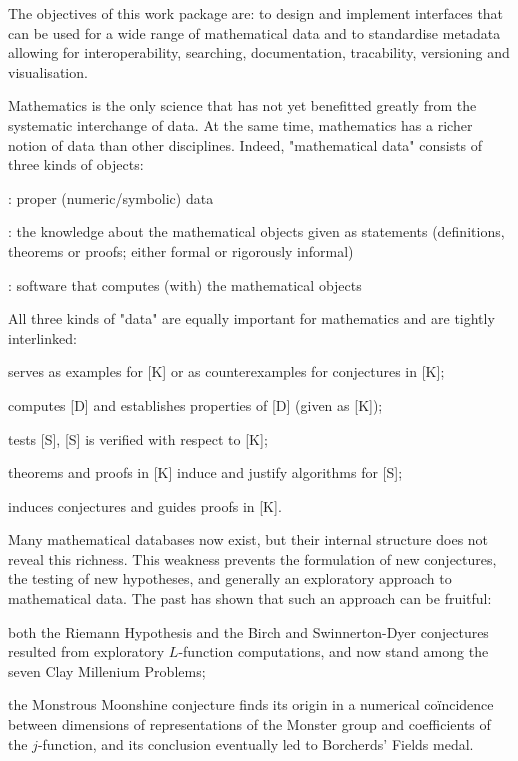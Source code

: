 \begin{workpackage}[id=dksbases,wphases=1-48!.5,
  title=Data/Knowledge/Software-Bases,lead=JU,
  ZHRM=1,JURM=36,USHRM=12,UWRM=3]

\begin{wpobjectives}
The objectives of this work package are: to design and implement interfaces that can be used for a wide range of mathematical data and to standardise metadata allowing for interoperability, searching, documentation, tracability, versioning and visualisation.
\end{wpobjectives}


\begin{wpdescription}
Mathematics is the only science that has not yet benefitted greatly from the systematic interchange of data. At the same time, mathematics has a richer notion of data than other disciplines.
Indeed, "mathematical data" consists of three kinds of objects:
\begin{compactitem}
\item[] [D]: proper (numeric/symbolic) data
\item[] [K]:  the knowledge about the mathematical objects given as statements (definitions, theorems or proofs; either formal or rigorously informal)
\item[] [S] : software that computes (with) the mathematical objects
\end{compactitem}

All three kinds of "data" are equally important for mathematics and are tightly interlinked:
\begin{compactitem}
\item[] [D] serves as examples for [K] or as counterexamples for conjectures in [K];
\item[] [S] computes [D] and establishes properties of [D] (given as [K]);
\item[] [D] tests [S], [S] is verified with respect to [K];
\item[] theorems and proofs in [K] induce and justify algorithms for [S];
\item[] [D] induces conjectures and guides proofs in [K].
\end{compactitem}

Many mathematical databases now exist, but their internal structure does not reveal this richness. This weakness prevents the formulation of new conjectures, the testing of new hypotheses, and generally an exploratory approach to mathematical data. The past has shown that such an approach can be fruitful: 
\begin{compactitem}
\item both the Riemann Hypothesis and the Birch and Swinnerton-Dyer conjectures resulted from exploratory $L$-function computations, and now stand among the seven Clay Millenium Problems;
\item the Monstrous Moonshine conjecture finds its origin in a numerical co\"incidence between dimensions of representations of the Monster group and coefficients of the $j$-function, and its conclusion eventually led to Borcherds' Fields medal.
\end{compactitem}


\end{wpdescription}
\end{workpackage}
